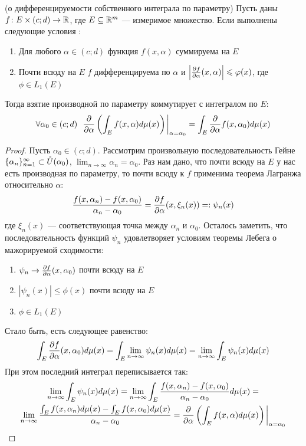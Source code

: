 \begin{theorem} (о дифференцируемости собственного интеграла по параметру)
	Пусть даны $f \colon E \times (c; d) \to \mathbb{R}$, где $E \subseteq \mathbb{R}^m$ --- измеримое множество. Если выполнены следующие условия :
	\begin{enumerate}
		\item Для любого $\alpha \in (c; d)$ функция $f(x, \alpha)$ суммируема на $E$
		
		\item Почти всюду на $E$ $f$ дифференцируема по $\alpha$ и $\left|\frac{\partial f}{\partial \alpha}(x, \alpha)\right| \leqslant \varphi(x)$, где $\phi \in L_1(E)$
	\end{enumerate}
	Тогда взятие производной по параметру коммутирует с интегралом по $E$:
	\[
		\forall \alpha_0 \in (c; d)\ \ \pd{}{\alpha} \ps{\int_E f(x, \alpha)d\mu(x)}\at_{\alpha=\alpha_0} = \int_E \pd{}{\alpha}f(x, \alpha_0)d\mu(x)
	\]
\end{theorem}

\begin{proof}
	Пусть $\alpha_0 \in (c; d)$. Рассмотрим произвольную последовательность Гейне $\{\alpha_n\}_{n = 1}^\infty \subset \mathring{U}(\alpha_0)$, $\lim_{n \to \infty} \alpha_n = \alpha_0$. Раз нам дано, что почти всюду на $E$ у нас есть производная по параметру, то почти всюду к $f$ применима теорема Лагранжа относительно $\alpha$:
	\[
		\frac{f(x, \alpha_n) - f(x, \alpha_0)}{\alpha_n - \alpha_0} = \frac{\partial f}{\partial \alpha}(x, \xi_n(x)) =: \psi_n(x)
	\]
	где $\xi_n(x)$ --- соответствующая точка между $\alpha_n$ и $\alpha_0$. Осталось заметить, что последовательность функций $\psi_n$ удовлетворяет условиям теоремы Лебега о мажорируемой сходимости:
	\begin{enumerate}
		\item $\psi_n \to \frac{\partial f}{\partial \alpha}(x, \alpha_0)$ почти всюду на $E$
		
		\item $|\psi_n(x)| \le \phi(x)$ почти всюду на $E$
		
		\item $\phi \in L_1(E)$
	\end{enumerate}
	Стало быть, есть следующее равенство:
	\[
		\int_E \frac{\partial f}{\partial \alpha}(x, \alpha_0)d\mu(x) = \int_E \lim_{n \to \infty} \psi_n(x) d\mu(x) = \lim_{n \to \infty} \int_E \psi_n(x) d\mu(x)
	\]
	При этом последний интеграл переписывается так:
	\begin{multline*}
		\lim_{n \to \infty} \int_E \psi_n(x) d\mu(x) = \lim_{n \to \infty} \int_E \frac{f(x, \alpha_n) - f(x, \alpha_0)}{\alpha_n - \alpha_0}d\mu(x) =
		\\
		\lim_{n \to \infty} \frac{\int_E f(x, \alpha_n)d\mu(x) - \int_E f(x, \alpha_0)d\mu(x)}{\alpha_n - \alpha_0} = \pd{}{\alpha} \ps{\int_E f(x, \alpha)d\mu(x)}\at_{\alpha=\alpha_0}
	\end{multline*}
\end{proof}


